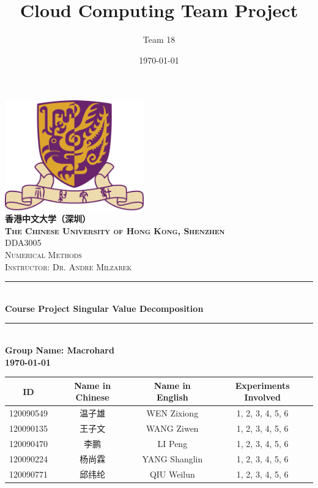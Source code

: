 \title{Cloud Computing Team Project} %
\author{Team 18}%
\date{\today}%





\begin{titlepage}
    \centering
    \vspace*{0.5 cm}
    \includegraphics[scale = 0.75,width=6cm]{CUHK}\\[1.0 cm]   %
    \textsc{\Large \textbf{香港中文大学（深圳）}}\\
    \textsc{\large \textbf{The Chinese University of Hong Kong, Shenzhen}}\\[1.0 cm] 
    \textsc{\Large DDA3005}\\[0.5 cm] 
    \textsc{\Large Numerical Methods}\\[0.5 cm]               %
    \textsc{\large Instructor: Dr. Andre Milzarek}\\[0.5 cm]
    \rule{\linewidth}{0.2 mm} \\[0.4 cm]
    { \huge \bfseries Course Project
     Singular Value Decomposition}\\
    \rule{\linewidth}{0.2 mm} \\[1.5 cm]
    {\LARGE \bfseries Group Name: Macrohard}\\[0.3 cm] 
    {\Large \bfseries \today}
 
\clearpage

\vspace*{\fill}
\begin{center}
    \Large
    \begin{tabular}{ |c|c|c|c|} 
    \hline
     ID &Name in Chinese & Name in English & Experiments Involved \\ 
     \hline
     120090549 &温子雄 &WEN Zixiong &  1, 2, 3, 4, 5, 6 \\
     \hline
     120090135 &王子文 & WANG Ziwen & 1, 2, 3, 4, 5, 6 \\ 
     \hline
     120090470 &李鹏 & LI Peng & 1, 2, 3, 4, 5, 6 \\
     \hline
     120090224 &杨尚霖 & YANG Shanglin & 1, 2, 3, 4, 5, 6 \\
     \hline
     120090771 &邱纬纶 & QIU Weilun & 1, 2, 3, 4, 5, 6 \\
     \hline
    \end{tabular}
    \\[1.0 cm]
    \\
    \lipsum[1]
    

\end{center}
\end{titlepage}
